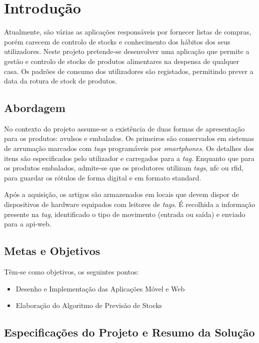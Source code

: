%
%
\chapter{Introdução} \label{cap1}

Atualmente, são várias as aplicações responsáveis por fornecer listas de compras, porém carecem de controlo de stocks e conhecimento dos hábitos dos seus utilizadores. Neste projeto pretende-se desenvolver uma aplicação que permite a gestão e controlo de stocks de produtos alimentares na despensa de qualquer casa. Os padrões de consumo dos utilizadores são registados, permitindo prever a data da rotura de stock de produtos.

%
%
\section{Abordagem} \label{sec11}

No contexto do projeto assume-se a existência de duas formas de apresentação para os produtos: avulsos e embalados. Os primeiros são conservados em sistemas de arrumação marcados com \textit{tags} programáveis por \textit{smartphones}. Os detalhes dos itens são especificados pelo utilizador e carregados para a \textit{tag}. Enquanto que para os produtos embalados, admite-se que os produtores utilizam \textit{tags}, \acrfull{nfc} ou \acrfull{rfid}, para guardar os rótulos de forma digital e em formato standard.

Após a aquisição, os artigos são armazenados em locais que devem dispor de dispositivos de hardware equipados com leitores de \textit{tags}. É recolhida a informação presente na \textit{tag}, identificado o tipo de movimento (entrada ou saída) e enviado para a \gls{api-web}.

%
%
\section{Metas e Objetivos} \label{sec12}
Têm-se como objetivos, os seguintes pontos:
\begin{itemize} \itemsep 0pt
	\item Desenho e Implementação das Aplicações Móvel e Web
	\item Elaboração do Algoritmo de Previsão de Stocks
\end{itemize}


%
%
\section{Especificações do Projeto e Resumo da Solução} \label{sec13}

